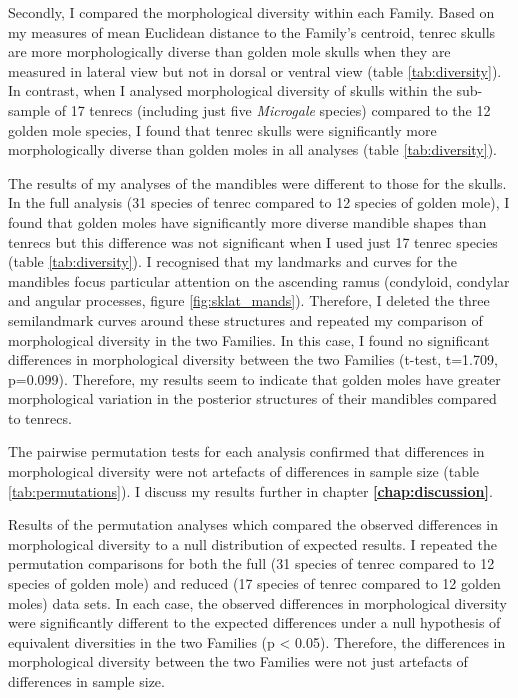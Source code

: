 	Secondly, I compared the morphological diversity within each Family. Based on my measures of mean Euclidean distance to the Family's centroid, tenrec skulls are more morphologically diverse than golden mole skulls when they are measured in lateral view but not in dorsal or ventral view (table \ref{tab:diversity}). In contrast, when I analysed morphological diversity of skulls within the sub-sample of 17 tenrecs (including just five \textit{Microgale} species) compared to the 12 golden mole species, I found that tenrec skulls were significantly more morphologically diverse than golden moles in all analyses (table \ref{tab:diversity}).
		
	The results of my analyses of the mandibles were different to those for the skulls. In the full analysis (31 species of tenrec compared to 12 species of golden mole), I found that golden moles have significantly more diverse mandible shapes than tenrecs but this difference was not significant when I used just 17 tenrec species (table \ref{tab:diversity}). 
	I recognised that my landmarks and curves for the mandibles focus particular attention on the ascending ramus (condyloid, condylar and angular processes, figure \ref{fig:sklat_mands}). Therefore, I  deleted the three semilandmark curves around these structures and repeated my comparison of morphological diversity in the two Families. In this case, I found no significant differences in morphological diversity between the two Families (t-test, t=1.709, p=0.099). Therefore, my results seem to indicate that golden moles have greater morphological variation in the posterior structures of their mandibles compared to tenrecs.
	

	The pairwise permutation tests for each analysis confirmed that differences in morphological diversity were not artefacts of differences in sample size (table \ref{tab:permutations}). I discuss my results further in chapter \textbf{\ref{chap:discussion}}.
	
\begin{table}[!htbp]			
	\caption[Results of the permutation tests]{Results of the permutation analyses which compared the observed differences in morphological diversity to a null distribution of expected results. I repeated the permutation comparisons for both the full (31 species of tenrec compared to 12 species of golden mole) and reduced (17 species of tenrec compared to 12 golden moles) data sets. In each case, the observed differences in morphological diversity were significantly different to the expected differences under a null hypothesis of equivalent diversities in the two Families (p < 0.05). Therefore, the differences in morphological diversity between the two Families were not just artefacts of differences in sample size.}
	 
	\label{tab:permutations}  
\end{table}
	


	
	





